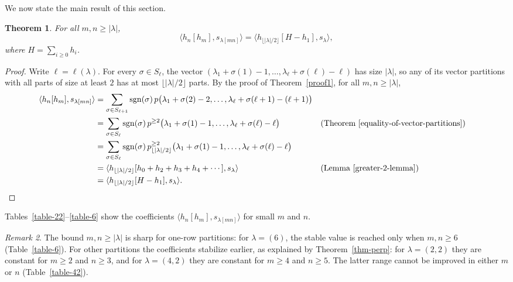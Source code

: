 \documentclass[reqno]{amsart}
\theoremstyle{plain}
\newtheorem{theorem}{Theorem}[section]
\theoremstyle{definition}
\theoremstyle{remark}
\newtheorem{remark}[theorem]{Remark}
\theoremstyle{plain}
\DeclareMathOperator{\sgn}{sgn}
\begin{document}
We now state the main result of this section.

\begin{theorem}\label{omitting-h-1}
For all $m,n\geq |\lambda|$,
$$\langle h_n[h_m],s_{\lambda[mn]}\rangle=\langle h_{\lfloor|\lambda|/2\rfloor}[H-h_1],s_\lambda\rangle,$$
where $H=\sum_{i\ge0}h_i$.
\end{theorem}
\begin{proof}
Write $\ell=\ell(\lambda)$. For every $\sigma\in S_{\ell}$, the vector
$(\lambda_1+\sigma(1)-1,\dots,\lambda_{\ell}+\sigma(\ell)-\ell)$ has size
$|\lambda|$, so any of its vector partitions with all parts of size at least
$2$ has at most $\lfloor|\lambda|/2\rfloor$ parts. By the proof of
Theorem~\ref{proof1}, for all $m,n\geq |\lambda|$,
\begin{align*}
\langle h_n[h_m],s_{\lambda[mn]}\rangle
&=\sum_{\sigma\in S_{\ell+1}}\sgn(\sigma)\, p\big(\lambda_1+\sigma(2)-2,\dots,\lambda_{\ell}+\sigma(\ell+1)-(\ell+1)\big)\\
&=\sum_{\sigma\in S_{\ell}}\sgn(\sigma)\,p^{\geq 2}\big(\lambda_1+\sigma(1)-1,\dots,\lambda_{\ell}+\sigma(\ell)-\ell\big) &&\text{(Theorem~\ref{equality-of-vector-partitions})}\\
&=\sum_{\sigma\in S_{\ell}}\sgn(\sigma)\,p_{\lfloor |\lambda|/2\rfloor}^{\geq 2}\big(\lambda_1+\sigma(1)-1,\dots,\lambda_{\ell}+\sigma(\ell)-\ell\big)\\
&=\langle h_{\lfloor |\lambda|/2\rfloor}[h_0+h_2+h_3+h_4+\cdots],s_\lambda\rangle &&\text{(Lemma~\ref{greater-2-lemma})}\\
&=\langle h_{\lfloor |\lambda|/2\rfloor}[H-h_1],s_\lambda\rangle.
\end{align*}
\end{proof}

Tables~\ref{table-22}--\ref{table-6} show the coefficients
$\langle h_n[h_m], s_{\lambda[mn]}\rangle$ for small $m$ and $n$.

\begin{remark}
The bound $m,n\ge|\lambda|$ is sharp for one-row partitions: for $\lambda=(6)$,
the stable value is reached only when $m,n\geq 6$ (Table~\ref{table-6}). For
other partitions the coefficients stabilize earlier, as explained by
Theorem~\ref{thm-perp}: for $\lambda=(2,2)$ they are constant for $m\ge2$ and
$n\ge3$, and for $\lambda=(4,2)$ they are constant for $m\ge4$ and $n\ge5$.
The latter range cannot be improved in either $m$ or $n$ (Table~\ref{table-42}).
\end{remark}
\end{document}

